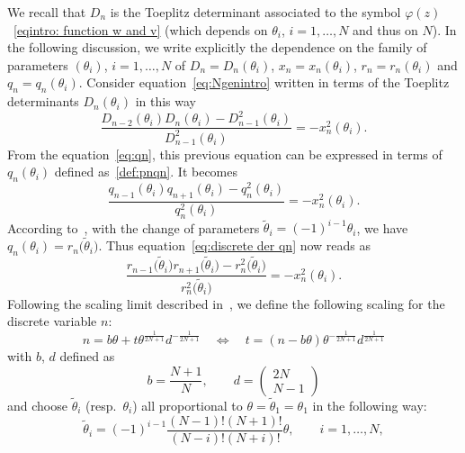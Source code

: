 \documentclass[pdftex]{sigma}%
\numberwithin{equation}{section}
\newcommand{\N}{\mathbb{N}}
\begin{document}
We recall that $D_n$ is the Toeplitz determinant associated to the symbol $\varphi(z)$~\eqref{eqintro: function w and v} (which depends on $\theta_i$, $i=1,\dots,N$ and thus on $N$). In the following discussion, we write explicitly the dependence on the family of parameters $(\theta_i)$, $i=1,\dots,N$ of $D_n=D_n(\theta_i)$, $x_n=x_n(\theta_i)$, ${r_n=r_n(\theta_i)}$ and $q_n=q_n(\theta_i)$. Consider equation~\eqref{eq:Ngenintro} written in terms of the Toeplitz determinants $D_n(\theta_i)$ in this way
\begin{equation}
	\label{eq:toepl discrete der intro}
\frac{D_{n-2}(\theta_i)D_n(\theta_i)-D_{n-1}^2(\theta_i)}{D_{n-1}^2(\theta_i)}=-x_n^2(\theta_i).
\end{equation}
From the equation~\eqref{eq:qn}, this previous equation can be expressed in terms of $q_n(\theta_i)$ defined as~\eqref{def:pnqn}. It becomes
\begin{equation}
	\label{eq:discrete der qn}
\frac{q_{n-1}(\theta_i)q_{n+1}(\theta_i)-q_{n}^2(\theta_i)}{q_{n}^2(\theta_i)}=-x_n^2(\theta_i).
\end{equation}
 According to~\cite[Lemma~8]{betea2021multicritical}, with the change of parameters $\tilde{\theta}_i=(-1)^{i-1}\theta_i$, we have $q_n(\theta_i)=r_n\big(\tilde{\theta}_i\big)$. Thus equation~\eqref{eq:discrete der qn} now reads as
\begin{equation}
\label{eq:discrete der pn}
\frac{r_{n-1}\big(\tilde{\theta}_i\big)r_{n+1}\big(\tilde{\theta}_i\big)-r_{n}^2\big(\tilde{\theta}_i\big)}{r_{n}^2\big(\tilde{\theta}_i\big)}=-x_n^2(\theta_i).
\end{equation}
Following the scaling limit described in~\cite[Theorem~1]{betea2021multicritical}, we define the following scaling for the discrete variable $n$:
\begin{equation}
	\label{eq: continuous variable}
n=b\theta +t\theta^{\frac{1}{2N+1}}d^{-\frac{1}{2N+1}} \quad \iff \quad
t = (n-b\theta)\theta^{-\frac{1}{2N+1}}d^{\frac{1}{2N+1}}
\end{equation}
with $b$, $d$ defined as
\begin{equation*}
b=\frac{N+1}{N}, \qquad
d=\begin{pmatrix}2N\\N-1\end{pmatrix}
\end{equation*}
and choose $\tilde{\theta}_i$ (resp.\ $\theta_i$) all proportional to $\theta = \tilde{\theta}_1=\theta_1$ in the following way:
\begin{equation*}
\tilde{\theta}_i=(-1)^{i-1}\frac{(N-1)!(N+1)!}{(N-i)!(N+i)!}\theta, \qquad
i=1,\dots, N,
\end{equation*}
\end{document}
